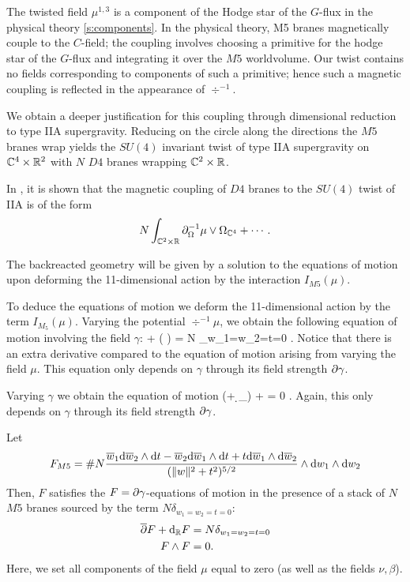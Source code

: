 The twisted field $\mu^{1,3}$ is a component of the Hodge star of the $G$-flux in the physical theory \ref{s:components}. 
In the physical theory, M5 branes magnetically couple to the $C$-field; the coupling involves choosing a primitive for the hodge star of the $G$-flux and integrating it over the $M5$ worldvolume. Our twist contains no fields corresponding to components of such a primitive; hence such a magnetic coupling is reflected in the appearance of $\div^{-1}$. 

\parsec[]

We obtain a deeper justification for this coupling through dimensional reduction to type IIA supergravity. 
Reducing on the circle along the directions the $M5$ branes wrap yields the $SU(4)$ invariant twist of type IIA supergravity on $\mathbb C^4 \times \mathbb R^2$ with $N$ $D4$ branes wrapping $\mathbb C^2 \times \mathbb R$. 

In \cite{CLSugra}, it is shown that the magnetic coupling of $D4$ branes to the $SU(4)$ twist of IIA is of the form
\[
N \int _{\mathbb{C}^2 \times \mathbb R} \partial_{\Omega}^{-1} \mu \vee \Omega_{\mathbb{C}^4} + \cdots .
\]

\parsec[s:m5backreact]

The backreacted geometry will be given by a solution to the equations of motion upon deforming the 11-dimensional action by the interaction $I_{M5}(\mu)$. 

To deduce the equations of motion we deform the 11-dimensional action by the term $I_{M_5}(\mu)$.
Varying the potential $\div^{-1} \mu$, we obtain the following equation of motion involving the field $\gamma$:
\beqn\label{eqn:m5eom1}
\dbar \del \gamma + \div \left( \mu\right) \wedge \del \gamma = N \delta_{w_1=w_2=t=0} .
\eeqn
Notice that there is an extra derivative compared to the equation of motion arising from varying the field $\mu$. 
This equation only depends on $\gamma$ through its field strength $\partial \gamma$. 

Varying $\gamma$ we obtain the equation of motion 
\beqn\label{eqn:m5eom2}
(\dbar + \d_\RR) \mu + \del \gamma \del \gamma = 0 .
\eeqn 
Again, this only depends on $\gamma$ through its field strength $\partial \gamma$.


\begin{lem}
\label{lem:ads7flux}
Let
\[
F_{M5} = \# N \frac{\overline{w}_1 {\rm d} \overline{w}_2 \wedge {\rm d} t - \overline{w}_2 {\rm d} \overline{w}_1 \wedge {\rm d} t + t {\rm d} \overline{w}_1 \wedge {\rm d} \overline{w}_2}{(\|w\|^2 + t^2)^{5/2}} \wedge {\rm d} w_1 \wedge {\rm d} w_2
\]
Then, $F$ satisfies the $F = \partial\gamma$-equations of motion in the presence of a stack of $N$ $M5$ branes sourced by the term $N \delta_{w_1=w_2=t=0}$:
\begin{align*}
\overline{\partial} F + {\rm d}_{\mathbb R} F & = N \delta_{w_1=w_2=t=0}  \\ 
F \wedge F & = 0 .
\end{align*}
Here, we set all components of the field $\mu$ equal to zero (as well as the fields $\nu,\beta$). 
\end{lem}


